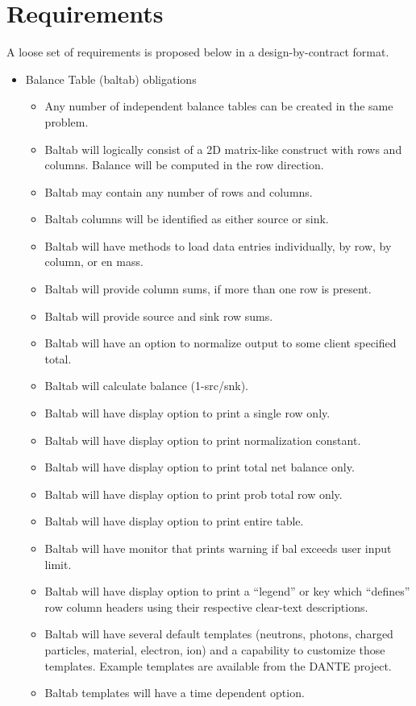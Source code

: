 \documentclass[reqno]{lanl}
\begin{document}
\section*{Requirements}
A loose set of requirements is proposed below in a design-by-contract
format.
\begin{itemize}

\item Balance Table (baltab) obligations
\begin{itemize}
\item Any number of independent balance tables can be
      created in the same problem.
\item Baltab will logically consist of a 2D matrix-like construct with
      rows and columns.  Balance will be computed in the row direction.
\item Baltab may contain any number of rows and columns.
\item Baltab columns will be identified as either source or sink.
\item Baltab will have methods to load data entries individually,
      by row, by column, or en mass.
\item Baltab will provide column sums, if more than one row is present.
\item Baltab will provide source and sink row sums.
\item Baltab will have an option to normalize output to some client
      specified total.
\item Baltab will calculate balance (1-src/snk).
\item Baltab will have display option to print a single row only.
\item Baltab will have display option to print normalization constant.
\item Baltab will have display option to print total net balance only.
\item Baltab will have display option to print prob total row only.
\item Baltab will have display option to print entire table.
\item Baltab will have monitor that prints warning if bal exceeds 
      user input limit.
\item Baltab will have display option to print a ``legend'' or key which
      ``defines'' row column headers using their respective
       clear-text descriptions.
\item Baltab will have several default templates (neutrons, photons,
      charged particles, material, electron, ion) and a capability
      to customize those templates.  Example templates are available
      from the DANTE project.
\item Baltab templates will have a time dependent option.
\end{itemize}


\end{itemize}
\end{document}
